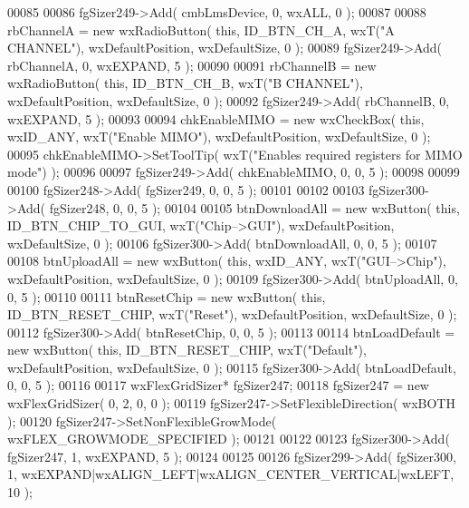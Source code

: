 \begin{DoxyCode}
00085     
00086     fgSizer249->Add( cmbLmsDevice, 0, wxALL, 0 );
00087     
00088     rbChannelA = \textcolor{keyword}{new} wxRadioButton( \textcolor{keyword}{this}, ID_BTN_CH_A, wxT(\textcolor{stringliteral}{"A CHANNEL"}), wxDefaultPosition, wxDefaultSize, 
      0 );
00089     fgSizer249->Add( rbChannelA, 0, wxEXPAND, 5 );
00090     
00091     rbChannelB = \textcolor{keyword}{new} wxRadioButton( \textcolor{keyword}{this}, ID_BTN_CH_B, wxT(\textcolor{stringliteral}{"B CHANNEL"}), wxDefaultPosition, wxDefaultSize, 
      0 );
00092     fgSizer249->Add( rbChannelB, 0, wxEXPAND, 5 );
00093     
00094     chkEnableMIMO = \textcolor{keyword}{new} wxCheckBox( \textcolor{keyword}{this}, wxID\_ANY, wxT(\textcolor{stringliteral}{"Enable MIMO"}), wxDefaultPosition, wxDefaultSize, 0
       );
00095     chkEnableMIMO->SetToolTip( wxT(\textcolor{stringliteral}{"Enables required registers for MIMO mode"}) );
00096     
00097     fgSizer249->Add( chkEnableMIMO, 0, 0, 5 );
00098     
00099     
00100     fgSizer248->Add( fgSizer249, 0, 0, 5 );
00101     
00102     
00103     fgSizer300->Add( fgSizer248, 0, 0, 5 );
00104     
00105     btnDownloadAll = \textcolor{keyword}{new} wxButton( \textcolor{keyword}{this}, ID_BTN_CHIP_TO_GUI, wxT(\textcolor{stringliteral}{"Chip-->GUI"}), wxDefaultPosition, 
      wxDefaultSize, 0 );
00106     fgSizer300->Add( btnDownloadAll, 0, 0, 5 );
00107     
00108     btnUploadAll = \textcolor{keyword}{new} wxButton( \textcolor{keyword}{this}, wxID\_ANY, wxT(\textcolor{stringliteral}{"GUI-->Chip"}), wxDefaultPosition, wxDefaultSize, 0 );
00109     fgSizer300->Add( btnUploadAll, 0, 0, 5 );
00110     
00111     btnResetChip = \textcolor{keyword}{new} wxButton( \textcolor{keyword}{this}, ID_BTN_RESET_CHIP, wxT(\textcolor{stringliteral}{"Reset"}), wxDefaultPosition, wxDefaultSize, 0
       );
00112     fgSizer300->Add( btnResetChip, 0, 0, 5 );
00113     
00114     btnLoadDefault = \textcolor{keyword}{new} wxButton( \textcolor{keyword}{this}, ID_BTN_RESET_CHIP, wxT(\textcolor{stringliteral}{"Default"}), wxDefaultPosition, 
      wxDefaultSize, 0 );
00115     fgSizer300->Add( btnLoadDefault, 0, 0, 5 );
00116     
00117     wxFlexGridSizer* fgSizer247;
00118     fgSizer247 = \textcolor{keyword}{new} wxFlexGridSizer( 0, 2, 0, 0 );
00119     fgSizer247->SetFlexibleDirection( wxBOTH );
00120     fgSizer247->SetNonFlexibleGrowMode( wxFLEX\_GROWMODE\_SPECIFIED );
00121     
00122     
00123     fgSizer300->Add( fgSizer247, 1, wxEXPAND, 5 );
00124     
00125     
00126     fgSizer299->Add( fgSizer300, 1, wxEXPAND|wxALIGN\_LEFT|wxALIGN\_CENTER\_VERTICAL|wxLEFT, 10 );

\end{DoxyCode}
